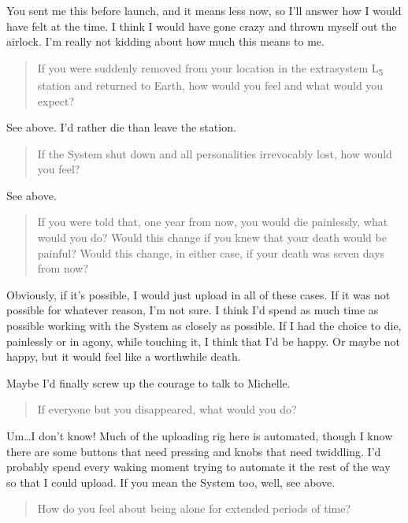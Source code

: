 \noindent You sent me this before launch, and it means less now, so I'll answer how I would have felt at the time. I think I would have gone crazy and thrown myself out the airlock. I'm really not kidding about how much this means to me.

\begin{quote}
If you were suddenly removed from your location in the extrasystem L\textsubscript{5} station and returned to Earth, how would you feel and what would you expect?
\end{quote}

\noindent See above. I'd rather die than leave the station.

\begin{quote}
If the System shut down and all personalities irrevocably lost, how would you feel?
\end{quote}

\noindent See above.

\begin{quote}
If you were told that, one year from now, you would die painlessly, what would you do? Would this change if you knew that your death would be painful? Would this change, in either case, if your death was seven days from now?
\end{quote}

\noindent Obviously, if it's possible, I would just upload in all of these cases. If it was not possible for whatever reason, I'm not sure. I think I'd spend as much time as possible working with the System as closely as possible. If I had the choice to die, painlessly or in agony, while touching it, I think that I'd be happy. Or maybe not happy, but it would feel like a worthwhile death.

Maybe I'd finally screw up the courage to talk to Michelle.

\begin{quote}
If everyone but you disappeared, what would you do?
\end{quote}

\noindent Um\ldots I don't know! Much of the uploading rig here is automated, though I know there are some buttons that need pressing and knobs that need twiddling. I'd probably spend every waking moment trying to automate it the rest of the way so that I could upload. If you mean the System too, well, see above.

\begin{quote}
How do you feel about being alone for extended periods of time?
\end{quote}

